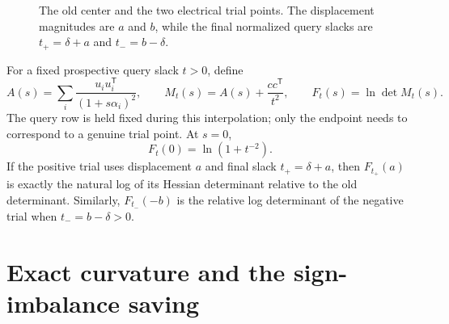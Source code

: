 \documentclass[11pt]{article}
\theoremstyle{definition}
\begin{document}
\begin{figure}[t]
\centering
{}
\caption{The old center and the two electrical trial points.  The displacement magnitudes are $a$ and $b$, while the final normalized query slacks are $t_+=\delta+a$ and $t_-=b-\delta$.}
\label{fig:trials}
\end{figure}

For a fixed prospective query slack $t>0$, define
\begin{equation}
  A(s)=\sum_i\frac{u_i u_i^{\mathsf T}}{(1+s\alpha_i)^2},
  \qquad
  M_t(s)=A(s)+\frac{cc^{\mathsf T}}{t^2},
  \qquad
  F_t(s)=\ln\det M_t(s).
  \label{eq:Fdef}
\end{equation}
The query row is held fixed during this interpolation; only the endpoint needs to correspond to a genuine trial point.  At $s=0$,
\begin{equation}
  F_t(0)=\ln(1+t^{-2}).
  \label{eq:F0}
\end{equation}
If the positive trial uses displacement $a$ and final slack $t_+=\delta+a$, then $F_{t_+}(a)$ is exactly the natural log of its Hessian determinant relative to the old determinant.  Similarly, $F_{t_-}(-b)$ is the relative log determinant of the negative trial when $t_-=b-\delta>0$.

\section{Exact curvature and the sign-imbalance saving}
\end{document}
